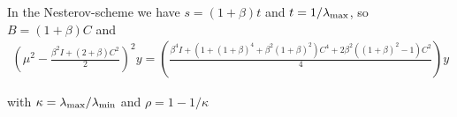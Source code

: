 \documentclass[english,12pt,a4paper]{article}
\begin{document}
In the Nesterov-scheme we  have $s=(1+\beta)t$ 
and  $t=1/\lambda_{\rm max}$, so $B = (1+\beta)C$ and
%
\begin{align*}
\left( \mu^2-\frac{\beta^2I + (2+\beta)C^2}{2}\right)^2 y = \left(   \frac{\beta^4I + (1 + (1+\beta)^4 +\beta^2(1+\beta)^2)C^4 + 2\beta^2((1+\beta)^2-1) C^2 }{4}\right)y
\end{align*}
%






with $\kappa=\lambda_{\rm max}/\lambda_{\rm min}$ and 
$\rho=1 -1/\kappa$
%










\dotfill

\end{document}
